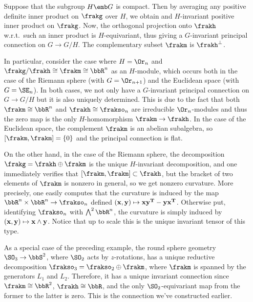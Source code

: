 \begin{example}\label{ex 1.4.6 Cap}
    Suppose that the subgroup $H\emb G$ is compact. Then by averaging any positive definite inner product on $\frakg$ over $H$, we obtain and $H$-invariant positive inner product on $\frakg$. Now, the orthogonal projection onto $\frakh$ w.r.t.\ such an inner product is $H$-equivariant, thus giving a $G$-invariant principal connection on $G\to G\slash H$. The complementary subset $\frakm$ is $\frakh^\perp$.

    In particular, consider the case where $H=\Or_n$ and $\frakg\slash\frakh\cong \frakm\cong \bbR^n$ as an $H$-module, which occurs both in the case of the Riemann sphere (with $G=\Or_{n+1}$) and the Euclidean space (with $G=\SE_n$). In both cases, we not only have a $G$-invariant principal connection on $G\to G\slash H$ but it is also uniquely determined. This is due to the fact that both $\frakm\cong\bbR^n$ and $\frakh\cong \frakso_n$ are irreducible $\Or_n$-modules and thus the zero map is the only $H$-homomorphism $\frakm\to \frakh$. In the case of the Euclidean space, the complement $\frakm$ is an abelian subalgebra, so $[\frakm,\frakm]=\{0\}$ and the principal connection is flat.

    On the other hand, in the case of the Riemann sphere, the decomposition $\frakg=\frakh\oplus\frakm$ is the unique $H$-invariant decomposition, and one immediately verifies that $[\frakm,\frakm]\subset\frakh$, but the bracket of two elements of $\frakm$ is nonzero in general, so we get nonzero curvature. More precisely, one easily computes that the curvature is induced by the map $\bbR^n\times\bbR^n\to \frakso_n$ defined $(\bf{x},\bf{y})\mapsto \bf{x}\bf{y}^T-\bf{y}\bf{x}^T$. Otherwise put, identifying $\frakso_n$ with $\bigwedge\nolimits^2\bbR^n$, the curvature is simply induced by $(\bf{x},\bf{y})\mapsto \bf{x}\wedge \bf{y}$. Notice that up to scale this is the unique invariant tensor of this type.
 \end{example}

 \begin{example}\label{ex round sphere 5}
    As a special case of the preceding example, the round sphere geometry $\SO_3\to \bbS^2$, where $\SO_2$ acts by $z$-rotations, has a unique reductive decomposition $\frakso_3=\frakso_2\oplus\frakm$, where $\frakm$ is spanned by the generators $L_1$ and $L_2$. Therefore, it has a unique invariant connection since $\frakm\cong \bbR^2$, $\frakh\cong \bbR$, and the only $\SO_2$-equivariant map from the former to the latter is zero. This is the connection we've constructed earlier.
\end{example}



